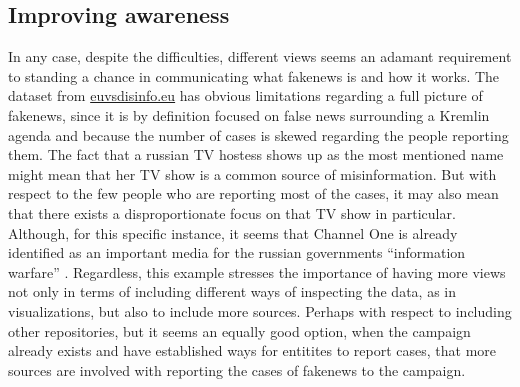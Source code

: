 \documentclass{article}
\begin{document}
\subsection{Improving awareness}
In any case, despite the difficulties, different views seems an adamant requirement to standing a chance in communicating what fakenews is and how it works. The dataset from \href{https://euvsdisinfo}{euvsdisinfo.eu} has obvious limitations regarding a full picture of fakenews, since it is by definition focused on false news surrounding a Kremlin agenda and because the number of cases is skewed regarding the people reporting them. The fact that a russian TV hostess shows up as the most mentioned name might mean that her TV show is a common source of misinformation. But with respect to the few people who are reporting most of the cases, it may also mean that there exists a disproportionate focus on that TV show in particular. Although, for this specific instance, it seems that Channel One is already identified as an important media for the russian governments ``information warfare'' \cite{the_narrative_battle}. Regardless, this example stresses the importance of having more views not only in terms of including different ways of inspecting the data, as in visualizations, but also to include more sources. Perhaps with respect to including other repositories, but it seems an equally good option, when the campaign already exists and have established ways for entitites to report cases, that more sources are involved with reporting the cases of fakenews to the campaign.
\end{document}
